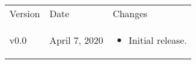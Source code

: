 
\begingroup
    \def\arraystretch{1.5}
    \begin{longtable}{| p{} | p{} | p{} |}
        \arrayrulecolor{gray!50}\hline
        Version & Date & Changes \\
        \arrayrulecolor{gray!50}\hline
        v0.0 & April 7, 2020 &
        \begin{itemize}
            \item Initial release.
        \end{itemize}\\

\end{longtable}
